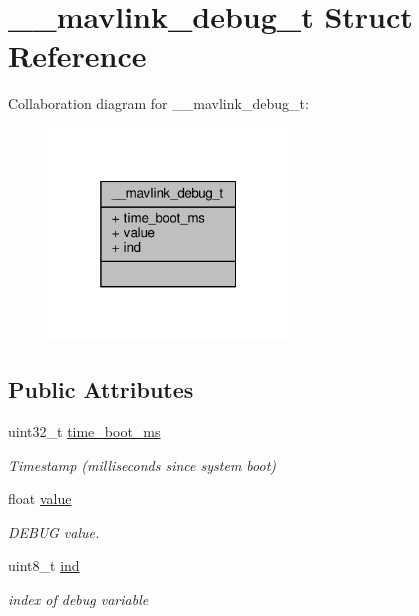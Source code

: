 \hypertarget{struct____mavlink__debug__t}{\section{\+\_\+\+\_\+mavlink\+\_\+debug\+\_\+t Struct Reference}
\label{struct____mavlink__debug__t}
}


Collaboration diagram for \+\_\+\+\_\+mavlink\+\_\+debug\+\_\+t\+:
\nopagebreak
\begin{figure}[H]
\begin{center}
\leavevmode
\includegraphics[width=181pt]{struct____mavlink__debug__t__coll__graph}
\end{center}
\end{figure}
\subsection*{Public Attributes}
\begin{DoxyCompactItemize}
\item 
\hypertarget{struct____mavlink__debug__t_afc1d1057d77ded488ac7b5034411604c}{uint32\+\_\+t \hyperlink{struct____mavlink__debug__t_afc1d1057d77ded488ac7b5034411604c}{time\+\_\+boot\+\_\+ms}}\label{struct____mavlink__debug__t_afc1d1057d77ded488ac7b5034411604c}

\begin{DoxyCompactList}\small\item\em Timestamp (milliseconds since system boot) \end{DoxyCompactList}\item 
\hypertarget{struct____mavlink__debug__t_aef9d0e91db46dff84494856146dcbcbe}{float \hyperlink{struct____mavlink__debug__t_aef9d0e91db46dff84494856146dcbcbe}{value}}\label{struct____mavlink__debug__t_aef9d0e91db46dff84494856146dcbcbe}

\begin{DoxyCompactList}\small\item\em D\+E\+B\+U\+G value. \end{DoxyCompactList}\item 
\hypertarget{struct____mavlink__debug__t_a540aecd3c98dd395f80edd92acab7c3d}{uint8\+\_\+t \hyperlink{struct____mavlink__debug__t_a540aecd3c98dd395f80edd92acab7c3d}{ind}}\label{struct____mavlink__debug__t_a540aecd3c98dd395f80edd92acab7c3d}

\begin{DoxyCompactList}\small\item\em index of debug variable \end{DoxyCompactList}\end{DoxyCompactItemize}


